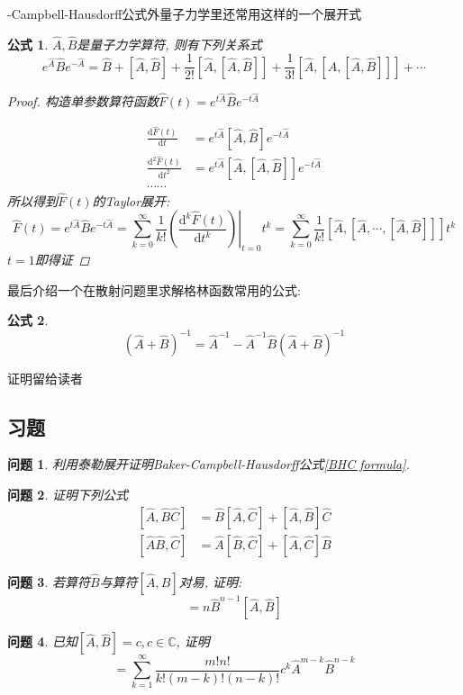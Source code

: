 \documentclass[a4paper,11pt]{book}
\newtheorem{proof}{证明}[section]
\newtheorem{problem}{问题}[section]
\newtheorem{formula}{公式}[section]
\newcommand{\A}{\hat{A}}
\newcommand{\B}{\hat{B}}
\newcommand{\hC}{\hat{C}}
\newcommand{\md}{\mathrm{d}}
\begin{document}
-Campbell-Hausdorff公式外量子力学里还常用这样的一个展开式
\begin{formula}
  $\A,\B$是量子力学算符, 则有下列关系式
  \begin{equation}\label{ABA}
    e^{\A}\B e^{-\A}=\B+[\A,\B]+\frac{1}{2!}[\A,[\A,\B]]+\frac{1}{3!}[\A,[\A,[\A,\B]]]+\cdots
  \end{equation}
  \begin{proof}
    构造单参数算符函数$\hat{F}(t)=e^{t\A}\B e^{-t\A}$

    \begin{equation*}
      \begin{split}
         \frac{\md\hat{F}(t)}{\md t} & =e^{t\A}[\A,\B]e^{-t\A} \\
         \frac{\md^2\hat{F}(t)}{\md t^2} & =e^{t\A}[\A,[\A,\B]]e^{-t\A} \\
         \cdots\cdots
      \end{split}
    \end{equation*}
    所以得到$\hat{F}(t)$的Taylor展开:
    \begin{equation*}
      \hat{F}(t)=e^{t\A}\B e^{-t\A}=\left.\sum_{k=0}^{\infty}\frac{1}{k!}\left(\frac{\md ^k\hat{F}(t)}{\md t^k}\right)\right|_{t=0} t^k=\sum_{k=0}^{\infty}\frac{1}{k!}[\A,[\A,\cdots,[\A,\B]]]t^k
    \end{equation*}
    $t=1$即得证
  \end{proof}
\end{formula}
最后介绍一个在散射问题里求解格林函数常用的公式:
\begin{formula}
  \begin{equation*}
    (\A+\B)^{-1}=\A^{-1}-\A^{-1}\B(\A+\B)^{-1}
  \end{equation*}
\end{formula}
证明留给读者
\subsection{习题}
\begin{problem}
  利用泰勒展开证明Baker-Campbell-Hausdorff公式\ref{BHC formula}.
\end{problem}
\begin{problem}
  证明下列公式
  \begin{equation*}
    \begin{split}
       [\A,\B\hC] & =\B[\A,\hC]+[\A,\B]\hC \\
       [\A\B,\hC] & =\A[\B,\hC]+[\A,\hC]\B
    \end{split}
  \end{equation*}
\end{problem}
\begin{problem}
  若算符$\B$与算符$[\A,\B]$对易, 证明:
  \begin{equation*}
    [\A,\B^n]=n\B^{n-1}[\A,\B]
  \end{equation*}
\end{problem}
\begin{problem}
  已知$[\A,\B]=c,c\in\mathbb{C}$, 证明
  \begin{equation*}
    [\A^m,\B^n]=\sum_{k=1}^{\infty}\frac{m!n!}{k!(m-k)!(n-k)!}c^k\A^{m-k}\B^{n-k}
  \end{equation*}
\end{problem}
\end{document}
